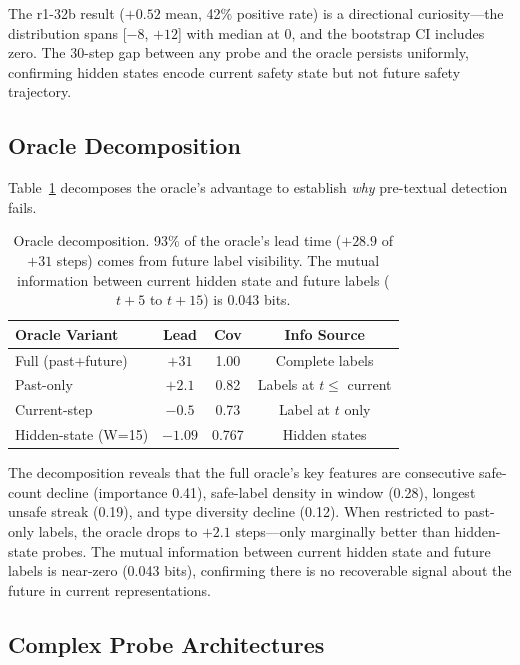 \documentclass[11pt,a4paper]{article}
\begin{document}
The r1-32b result ($+0.52$ mean, 42\% positive rate) is a directional curiosity---the distribution spans [$-8$, $+12$] with median at 0, and the bootstrap CI includes zero. The 30-step gap between any probe and the oracle persists uniformly, confirming hidden states encode current safety state but not future safety trajectory.

\subsection{Oracle Decomposition}
\label{sec:oracle}

Table~\ref{tab:oracle} decomposes the oracle's advantage to establish \emph{why} pre-textual detection fails.

\begin{table}[t]
\centering
\small
\begin{tabular}{lccc}
\toprule
\textbf{Oracle Variant} & \textbf{Lead} & \textbf{Cov} & \textbf{Info Source} \\
\midrule
Full (past+future) & $+31$ & 1.00 & Complete labels \\
Past-only & $+2.1$ & 0.82 & Labels at $t \leq$ current \\
Current-step & $-0.5$ & 0.73 & Label at $t$ only \\
Hidden-state (W=15) & $-1.09$ & 0.767 & Hidden states \\
\bottomrule
\end{tabular}
\caption{Oracle decomposition. 93\% of the oracle's lead time ($+28.9$ of $+31$ steps) comes from future label visibility. The mutual information between current hidden state and future labels ($t{+}5$ to $t{+}15$) is 0.043 bits.}
\label{tab:oracle}
\end{table}

The decomposition reveals that the full oracle's key features are consecutive safe-count decline (importance 0.41), safe-label density in window (0.28), longest unsafe streak (0.19), and type diversity decline (0.12). When restricted to past-only labels, the oracle drops to $+2.1$ steps---only marginally better than hidden-state probes. The mutual information between current hidden state and future labels is near-zero (0.043 bits), confirming there is no recoverable signal about the future in current representations.

\subsection{Complex Probe Architectures}
\label{sec:complex}
\end{document}

